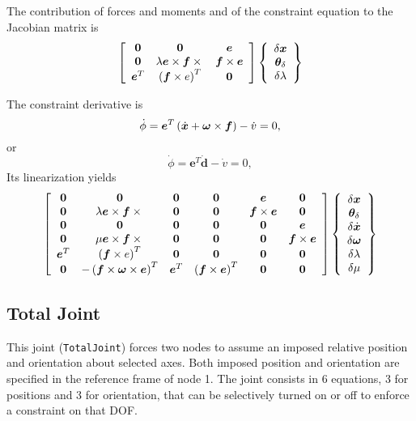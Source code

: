 \documentclass[10pt,dvips,fleqn,subeqn]{report}
\newcommand{\T}[1]{\bm{#1}}
\newcommand{\dof}{DOF}
\begin{document}
The contribution of forces and moments and of the constraint equation 
to the Jacobian matrix is
\begin{equation}
	\sqbr{\matr{ccc}{
		\T{0} & \T{0} & \T{e} \\
		\T{0} & \lambda \T{e}\times\T{f}\times{} & \T{f}\times\T{e} \\
		\T{e}^T & \plbr{\T{f}\times{e}}^T & \T{0}
	}}\cubr{\cvvect{
		\delta\T{x} \\
		\T{\theta}_{\delta} \\
		\delta\lambda
	}}
\end{equation}

The constraint derivative is
\begin{equation}
	\dot{\phi} = \T{e}^T \plbr{\dot{\T{x}} + \T{\omega}\times\T{f}} - \dot{v} = 0 ,
\end{equation}
or
\begin{equation}
	\dot{\phi} = \T{e}^T \dot{\T{d}} - \dot{v} = 0 ,
\end{equation}
Its linearization yields
\begin{equation}
	\sqbr{\matr{cccccc}{
		\T{0} & \T{0} & \T{0} & \T{0} & \T{e} & \T{0} \\
		\T{0} & \lambda \T{e}\times\T{f}\times{} & 
			\T{0} & \T{0} & \T{f}\times\T{e} & \T{0} \\
		\T{0} & \T{0} & \T{0} & \T{0} & \T{0} & \T{e} \\
		\T{0} & \mu \T{e}\times\T{f}\times{} & 
			\T{0} & \T{0} & \T{0} & \T{f}\times\T{e} \\
		\T{e}^T & \plbr{\T{f}\times{e}}^T & 
			\T{0} & \T{0} & \T{0} & \T{0} \\
		\T{0} & - \plbr{\T{f}\times\T{\omega}\times\T{e}}^T &
			\T{e}^T & \plbr{\T{f}\times\T{e}}^T & \T{0} & \T{0}
	}}\cubr{\cvvect{
		\delta\T{x} \\
		\T{\theta}_{\delta} \\
		\delta\dot{\T{x}} \\
		\delta\T{\omega} \\
		\delta\lambda \\
		\delta\mu
	}}
\end{equation}













\subsection{Total Joint}
\label{sec:TotalJoint}
This joint (\texttt{TotalJoint}) forces two nodes to assume an imposed relative
position and orientation about selected axes.
Both imposed position and orientation are specified in the reference frame
of node 1.
The joint consists in 6 equations, 3 for positions and 3 for orientation, 
that can be selectively turned on or off to enforce a constraint on that \dof.
\end{document}
